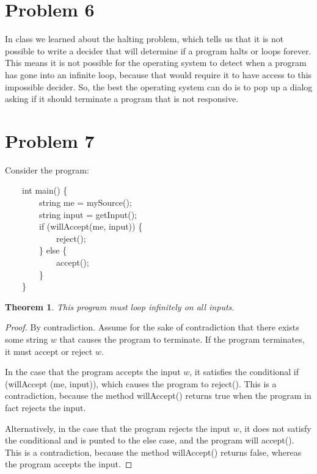 \documentclass[10pt,letter]{article}
\newtheorem*{thm}{Theorem}
\begin{document}
{\section*{Problem 6}
In class we learned about the halting problem, which tells us that it is not possible to write a decider that will determine if a program halts or loops forever. This means it is not possible for the operating system to detect when a program has gone into an infinite loop, because that would require it to have access to this impossible decider. So, the best the operating system can do is to pop up a dialog asking if it should terminate a program that is not responsive.

\section*{Problem 7}

Consider the program:
{\selectfont

$\qquad$int main() \{\\
$\qquad$$\qquad$string me = mySource();\\
$\qquad$$\qquad$string input = getInput();\\
$\qquad$$\qquad$if (willAccept(me, input)) \{\\
$\qquad$$\qquad$$\qquad$reject();\\
$\qquad$$\qquad$\} else \{\\
$\qquad$$\qquad$$\qquad$accept();\\
$\qquad$$\qquad$\}\\
$\qquad$\}
}
\begin{thm}This program must loop infinitely on all inputs.\end{thm}
\begin{proof}
By contradiction. Assume for the sake of contradiction that there exists some string $w$ that causes the program to terminate. If the program terminates, it must accept or reject $w$. 

In the case that the program accepts the input $w$, it satisfies the conditional {\selectfont if (willAccept (me, input))}, which causes the program to {\selectfont reject()}. This is a contradiction, because the method {\selectfont willAccept()} returns true when the program in fact rejects the input.

Alternatively, in the case that the program rejects the input $w$, it does not satisfy the conditional and is punted to the {\selectfont else} case, and the program will {\selectfont accept()}. This is a contradiction, because the method {\selectfont willAccept()} returns false, whereas the program accepts the input.


\end{proof}}
\end{document}
